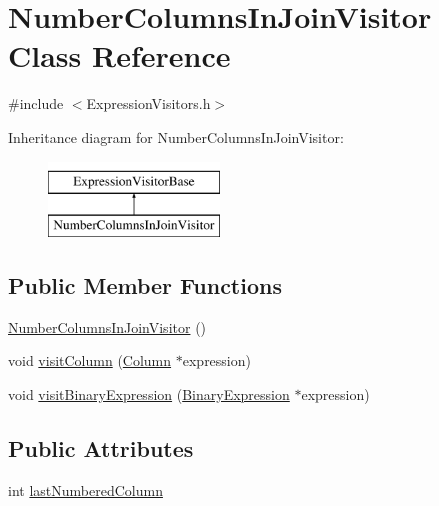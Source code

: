 \hypertarget{class_number_columns_in_join_visitor}{\section{Number\+Columns\+In\+Join\+Visitor Class Reference}
\label{class_number_columns_in_join_visitor}
}


{\ttfamily \#include $<$Expression\+Visitors.\+h$>$}

Inheritance diagram for Number\+Columns\+In\+Join\+Visitor\+:\begin{figure}[H]
\begin{center}
\leavevmode
\includegraphics[height=2.000000cm]{class_number_columns_in_join_visitor}
\end{center}
\end{figure}
\subsection*{Public Member Functions}
\begin{DoxyCompactItemize}
\item 
\hyperlink{class_number_columns_in_join_visitor_a5d09cffa1e191e46b312a3bcebc01b60}{Number\+Columns\+In\+Join\+Visitor} ()
\item 
void \hyperlink{class_number_columns_in_join_visitor_ac3b174509ec5ec5310ef73e47aa59694}{visit\+Column} (\hyperlink{class_column}{Column} $\ast$expression)
\item 
void \hyperlink{class_number_columns_in_join_visitor_a857c2d096fe87b1ac98ea50922d1c958}{visit\+Binary\+Expression} (\hyperlink{class_binary_expression}{Binary\+Expression} $\ast$expression)
\end{DoxyCompactItemize}
\subsection*{Public Attributes}
\begin{DoxyCompactItemize}
\item 
int \hyperlink{class_number_columns_in_join_visitor_af26374a4ce48016848edd71c935f92a3}{last\+Numbered\+Column}
\end{DoxyCompactItemize}


